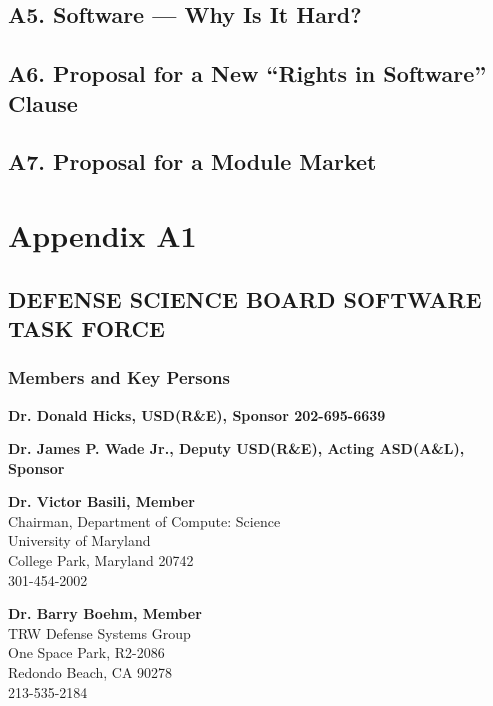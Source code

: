 \documentclass[12pt]{article}
\begin{document}
\subsection*{A5. Software — Why Is It Hard?}

\subsection*{A6. Proposal for a New “Rights in Software” Clause}

\subsection*{A7. Proposal for a Module Market}

\newpage

\section*{Appendix A1}
\begin{centering}

\subsection*{DEFENSE SCIENCE BOARD SOFTWARE TASK FORCE}

\subsubsection*{Members and Key Persons}
\end{centering}

\textbf{Dr. Donald Hicks, USD(R\&E), Sponsor 202-695-6639}

\medskip

\textbf{Dr. James P. Wade Jr., Deputy USD(R\&E), Acting ASD(A\&L), Sponsor}

\medskip

\textbf{Dr. Victor Basili, Member}\\
\hspace*{2cm}Chairman, Department of Compute: Science\\
\hspace*{2cm}University of Maryland\\
\hspace*{2cm}College Park, Maryland 20742\\
\hspace*{2cm}301-454-2002

\medskip

\textbf{Dr. Barry Boehm, Member}\\
\hspace*{2cm}TRW Defense Systems Group\\
\hspace*{2cm}One Space Park, R2-2086\\
\hspace*{2cm}Redondo Beach, CA 90278\\
\hspace*{2cm}213-535-2184
\end{document}
